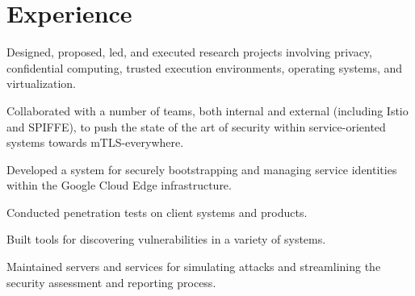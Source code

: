 \documentclass{resume}
\begin{document}
\hfill
\begin{minipage}[t]{0.66\textwidth}


\section{Experience}

\vspace{1.25\topsep} %
\begin{tightemize}
\item Designed, proposed, led, and executed research projects involving privacy, confidential computing, trusted execution environments, operating systems, and virtualization.
\end{tightemize}
\sectionsep

\begin{tightemize}
\item Collaborated with a number of teams, both internal and external (including Istio and SPIFFE), to push the state of the art of security within service-oriented systems towards mTLS-everywhere.
\item Developed a system for securely bootstrapping and managing service identities within the Google Cloud Edge infrastructure.
\end{tightemize}
\sectionsep

\begin{tightemize}
\item Conducted penetration tests on client systems and products.
\item Built tools for discovering vulnerabilities in a variety of systems.
\item Maintained servers and services for simulating attacks and streamlining the security assessment and reporting process.
\end{tightemize}
\sectionsep


\end{minipage}
\end{document}
